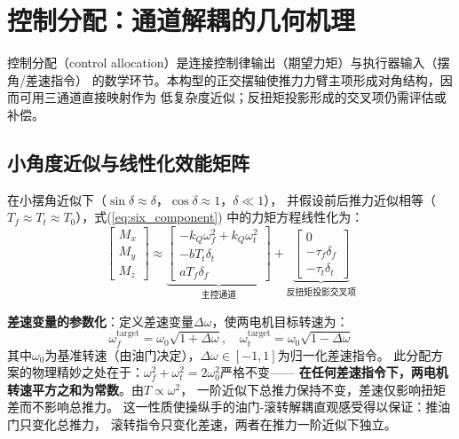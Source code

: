 \section{控制分配：通道解耦的几何机理}
\label{sec:allocation}

控制分配（control allocation）是连接控制律输出（期望力矩）与执行器输入（摆角/差速指令）
的数学环节。本构型的正交摆轴使推力力臂主项形成对角结构，因而可用三通道直接映射作为
低复杂度近似；反扭矩投影形成的交叉项仍需评估或补偿。

\subsection{小角度近似与线性化效能矩阵}

在小摆角近似下（$\sin\delta \approx \delta$，$\cos\delta \approx 1$，$\delta \ll 1$），
并假设前后推力近似相等（$T_f \approx T_t \approx T_0$），式(\ref{eq:six_component})
中的力矩方程线性化为：
\begin{equation}
    \begin{bmatrix} M_x \\ M_y \\ M_z \end{bmatrix}
    \approx
    \underbrace{
    \begin{bmatrix}
        -k_Q \omega_f^2 + k_Q \omega_t^2 \\
        -b T_t \delta_t \\
        a T_f \delta_f
    \end{bmatrix}
    }_{\text{主控通道}}
    +
    \underbrace{
    \begin{bmatrix}
        0 \\
        -\tau_f \delta_f \\
        -\tau_t \delta_t
    \end{bmatrix}
    }_{\text{反扭矩投影交叉项}}
    \label{eq:moment_linearized}
\end{equation}

\textbf{差速变量的参数化}：定义差速变量$\Delta\omega$，使两电机目标转速为：
\begin{equation}
    \omega_f^{\text{target}} = \omega_0 \sqrt{1 + \Delta\omega}, \quad
    \omega_t^{\text{target}} = \omega_0 \sqrt{1 - \Delta\omega}
    \label{eq:diff_def}
\end{equation}
其中$\omega_0$为基准转速（由油门决定），$\Delta\omega \in [-1, 1]$为归一化差速指令。
此分配方案的物理精妙之处在于：$\omega_f^2 + \omega_t^2 = 2\omega_0^2$严格不变——
\textbf{在任何差速指令下，两电机转速平方之和为常数}。由$T \propto \omega^2$，
一阶近似下总推力保持不变，差速仅影响扭矩差而不影响总推力。
这一性质使操纵手的油门-滚转解耦直观感受得以保证：推油门只变化总推力，
滚转指令只变化差速，两者在推力一阶近似下独立。

